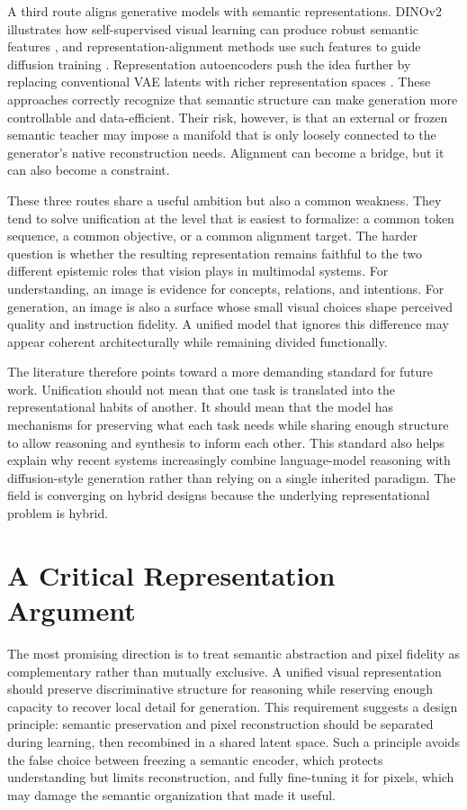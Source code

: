 \documentclass[12pt]{article}
\begin{document}
A third route aligns generative models with semantic representations. DINOv2 illustrates how self-supervised visual learning can produce robust semantic features \citep{oquab2023dinov2}, and representation-alignment methods use such features to guide diffusion training \citep{yu2025repa}. Representation autoencoders push the idea further by replacing conventional VAE latents with richer representation spaces \citep{zheng2025rae}. These approaches correctly recognize that semantic structure can make generation more controllable and data-efficient. Their risk, however, is that an external or frozen semantic teacher may impose a manifold that is only loosely connected to the generator's native reconstruction needs. Alignment can become a bridge, but it can also become a constraint.

These three routes share a useful ambition but also a common weakness. They tend to solve unification at the level that is easiest to formalize: a common token sequence, a common objective, or a common alignment target. The harder question is whether the resulting representation remains faithful to the two different epistemic roles that vision plays in multimodal systems. For understanding, an image is evidence for concepts, relations, and intentions. For generation, an image is also a surface whose small visual choices shape perceived quality and instruction fidelity. A unified model that ignores this difference may appear coherent architecturally while remaining divided functionally.

The literature therefore points toward a more demanding standard for future work. Unification should not mean that one task is translated into the representational habits of another. It should mean that the model has mechanisms for preserving what each task needs while sharing enough structure to allow reasoning and synthesis to inform each other. This standard also helps explain why recent systems increasingly combine language-model reasoning with diffusion-style generation rather than relying on a single inherited paradigm. The field is converging on hybrid designs because the underlying representational problem is hybrid.

\section{A Critical Representation Argument}

The most promising direction is to treat semantic abstraction and pixel fidelity as complementary rather than mutually exclusive. A unified visual representation should preserve discriminative structure for reasoning while reserving enough capacity to recover local detail for generation. This requirement suggests a design principle: semantic preservation and pixel reconstruction should be separated during learning, then recombined in a shared latent space. Such a principle avoids the false choice between freezing a semantic encoder, which protects understanding but limits reconstruction, and fully fine-tuning it for pixels, which may damage the semantic organization that made it useful.
\end{document}
